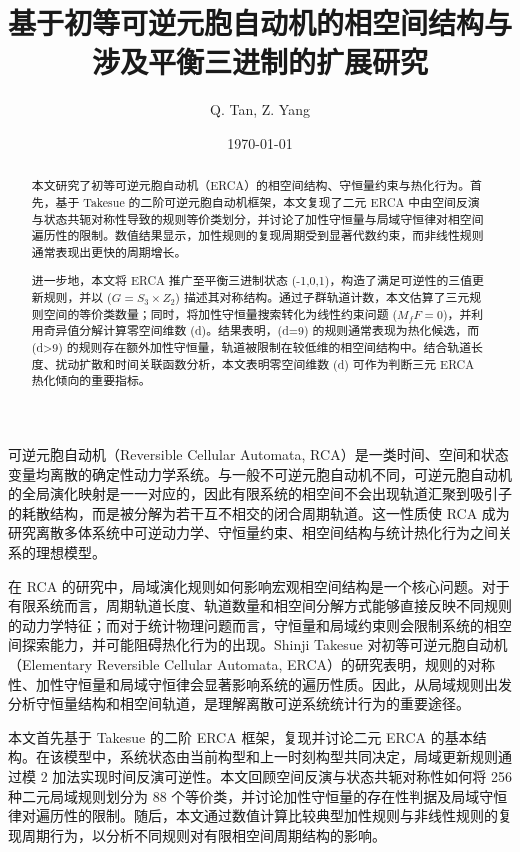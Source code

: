 \documentclass[reprint, amsmath, amssymb, aps, physrev,prb]{revtex4-2}
\begin{document}
\title{基于初等可逆元胞自动机的相空间结构与涉及平衡三进制的扩展研究}
\author{Q. Tan, Z. Yang}
\date{\today}

\begin{abstract}
本文研究了初等可逆元胞自动机（ERCA）的相空间结构、守恒量约束与热化行为。首先，基于 Takesue 的二阶可逆元胞自动机框架，本文复现了二元 ERCA 中由空间反演与状态共轭对称性导致的规则等价类划分，并讨论了加性守恒量与局域守恒律对相空间遍历性的限制。数值结果显示，加性规则的复现周期受到显著代数约束，而非线性规则通常表现出更快的周期增长。

进一步地，本文将 ERCA 推广至平衡三进制状态 ({-1,0,1})，构造了满足可逆性的三值更新规则，并以 ($G=S_3\times Z_2$) 描述其对称结构。通过子群轨道计数，本文估算了三元规则空间的等价类数量；同时，将加性守恒量搜索转化为线性约束问题 ($M_fF=0$)，并利用奇异值分解计算零空间维数 (d)。结果表明，(d=9) 的规则通常表现为热化候选，而 (d>9) 的规则存在额外加性守恒量，轨道被限制在较低维的相空间结构中。结合轨道长度、扰动扩散和时间关联函数分析，本文表明零空间维数 (d) 可作为判断三元 ERCA 热化倾向的重要指标。


\end{abstract}

\maketitle
可逆元胞自动机（Reversible Cellular Automata, RCA）是一类时间、空间和状态变量均离散的确定性动力学系统\cite{wolfram}\cite{shinjin}。与一般不可逆元胞自动机不同，可逆元胞自动机的全局演化映射是一一对应的，因此有限系统的相空间不会出现轨道汇聚到吸引子的耗散结构，而是被分解为若干互不相交的闭合周期轨道。这一性质使 RCA 成为研究离散多体系统中可逆动力学、守恒量约束、相空间结构与统计热化行为之间关系的理想模型。

在 RCA 的研究中，局域演化规则如何影响宏观相空间结构是一个核心问题。对于有限系统而言，周期轨道长度、轨道数量和相空间分解方式能够直接反映不同规则的动力学特征；而对于统计物理问题而言，守恒量和局域约束则会限制系统的相空间探索能力，并可能阻碍热化行为的出现。Shinji Takesue 对初等可逆元胞自动机（Elementary Reversible Cellular Automata, ERCA）的研究表明\cite{shinjin}，规则的对称性、加性守恒量和局域守恒律会显著影响系统的遍历性质。因此，从局域规则出发分析守恒量结构和相空间轨道，是理解离散可逆系统统计行为的重要途径。

本文首先基于 Takesue 的二阶 ERCA 框架，复现并讨论二元 ERCA 的基本结构。在该模型中，系统状态由当前构型和上一时刻构型共同决定，局域更新规则通过模 2 加法实现时间反演可逆性。本文回顾空间反演与状态共轭对称性如何将 256 种二元局域规则划分为 88 个等价类，并讨论加性守恒量的存在性判据及局域守恒律对遍历性的限制。随后，本文通过数值计算比较典型加性规则与非线性规则的复现周期行为，以分析不同规则对有限相空间周期结构的影响。
\end{document}

